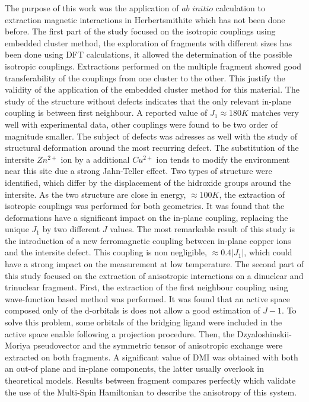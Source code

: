 \documentclass[10pt]{report}
\numberwithin{equation}{section}
\begin{document}
The purpose of this work was the application of $ab$ $initio$ calculation to extraction magnetic interactions in Herbertsmithite which has not been done before.
The first part of the study focused on the isotropic couplings using embedded cluster method, the exploration of fragments with different sizes has been done using DFT calculations, it allowed the determination of the possible isotropic couplings.
Extractions performed on the multiple fragment showed good transferability of the couplings from one cluster to the other.
This justify the validity of the application of the embedded cluster method for this material.
The study of the structure without defects indicates that the only relevant in-plane coupling is between first neighbour.
A reported value of $J_1\approx180 K$ matches very well with experimental data, other couplings were found to be two order of magnitude smaller.
The subject of defects was adresses as well with the study of structural deformation around the most recurring defect. 
The substitution of the intersite $Zn^{2+}$ ion by a additional $Cu^{2+}$ ion tends to modify the environment near this site due a strong Jahn-Teller effect.
Two types of structure were identified, which differ by the displacement of the hidroxide groups around the intersite. 
As the two structure are close in energy, $\approx 100 K$, the extraction of isotropic couplings was performed for both geometries.
It was found that the deformations have a significant impact on the in-plane coupling, replacing the unique $J_1$ by two different $J$ values.
The most remarkable result of this study is the introduction of a new ferromagnetic coupling between in-plane copper ions and the intersite defect.
This coupling is non negligible, $\approx 0.4 |J_1|$, which could have a strong impact on the measurement at low temperature.
The second part of this study focused on the extraction of anisotropic interactions on a dinuclear and trinuclear fragment.
First, the extraction of the first neighbour coupling using wave-function based method was performed. 
It was found that an active space composed only of the d-orbitals is does not allow a good estimation of $J-1$.
To solve this problem, some orbitals of the bridging ligand were included in the active space enable following a projection procedure.
Then, the Dzyaloshinskii-Moriya pseudovector and the symmetric tensor of anisotropic exchange were extracted on both fragments.
A significant value of DMI was obtained with both an out-of plane and in-plane components, the latter usually overlook in theoretical models. 
Results between fragment compares perfectly which validate the use of the Multi-Spin Hamiltonian to describe the anisotropy of this system.
\end{document}
